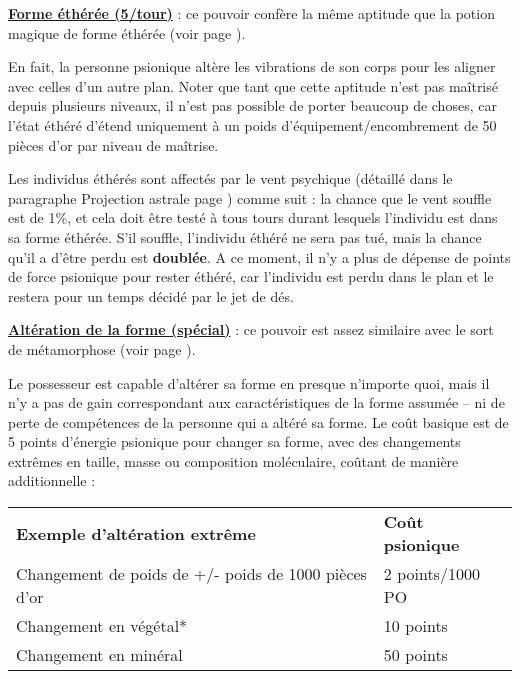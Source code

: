 \bigskip

\label{magicien-forme-etheree}\textbf{\uline{Forme éthérée (5/tour)}} : ce pouvoir confère la même aptitude que la potion magique de forme éthérée (voir page \pageref{objet-huile-etheree}).

\bigskip

En fait, la personne psionique altère les vibrations de son corps pour les aligner avec celles d'un autre plan. Noter que tant que cette aptitude n'est pas maîtrisé depuis plusieurs niveaux, il n'est pas possible de porter beaucoup de choses, car l'état éthéré d'étend uniquement à un poids d'équipement/encombrement de 50 pièces d'or par niveau de maîtrise.

\bigskip

Les individus éthérés sont affectés par le vent psychique (détaillé dans le paragraphe Projection astrale page \pageref{guerrier-projection-astrale}) comme suit : la chance que le vent souffle est de 1\%, et cela doit être testé à tous tours durant lesquels l'individu est dans sa forme éthérée. S'il souffle, l'individu éthéré ne sera pas tué, mais la chance qu'il a d'être perdu est \textbf{doublée}. A ce moment, il n'y a plus de dépense de points de force psionique pour rester éthéré, car l'individu est perdu dans le plan et le restera pour un temps décidé par le jet de dés.

\bigskip

\label{magicien-alteration-forme}\textbf{\uline{Altération de la forme (spécial)}} : ce pouvoir est assez similaire avec le sort de métamorphose (voir page \pageref{sort-metamorphose}).

\bigskip

Le possesseur est capable d'altérer sa forme en presque n'importe quoi, mais il n'y a pas de gain correspondant aux caractéristiques de la forme assumée -- ni de perte de compétences de la personne qui a altéré sa forme. Le coût basique est de 5 points d'énergie psionique pour changer sa forme, avec des changements extrêmes en taille, masse ou composition moléculaire, coûtant de manière additionnelle :

\bigskip

\begin{tabular}{ll}
\textbf{Exemple d'altération extrême} & \textbf{Coût psionique} \\
Changement de poids de +/- poids de 1000 pièces d'or & 2 points/1000 PO \\
Changement en végétal* & 10 points \\
Changement en minéral & 50 points \\
\end{tabular}

